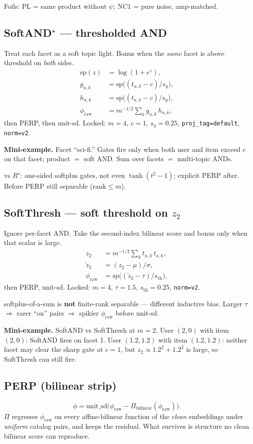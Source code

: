 \documentclass[11pt]{article}
\newcommand{\phonesub}[1]{\Needspace{6\baselineskip}\subsection*{#1}}
\newcommand{\Rstar}{R^{\star}}
\newcommand{\miniex}[1]{\par{\footnotesize\color{black!70}\textbf{Mini-example.} #1\par}}
\begin{document}
Foils: PL = same product without $\psi$;
NC1 = pure noise, amp-matched.

\phonesub{SoftAND$^{\star}$ --- thresholded AND}
Treat each facet as a soft topic light.
Bonus when the \emph{same} facet is above
threshold on \emph{both} sides.
\begin{align*}
\mathrm{sp}(z)&=\log(1+e^{z}),\\
g_{u,k}&=\mathrm{sp}\!\big((t_{u,k}-c)/s_g\big),\\
h_{a,k}&=\mathrm{sp}\!\big((t_{a,k}-c)/s_g\big),\\
\phi_{\mathrm{raw}}
  &= m^{-1/2}\sum_{k} g_{u,k}\,h_{a,k},
\end{align*}
then PERP, then unit-sd.
Locked: $m{=}4$, $c{=}1$, $s_g{=}0.25$,
\texttt{proj\_tag=default}, \texttt{norm=v2}.

\miniex{Facet ``sci-fi.''  Gates fire only
when both user and item exceed $c$ on that
facet; product $=$ soft AND.  Sum over
facets $=$ multi-topic ANDs.}

vs $\Rstar$: one-sided softplus gates, not
even $\tanh(t^{2}-1)$; explicit PERP after.
Before PERP still separable
($\mathrm{rank}\le m$).

\phonesub{SoftThresh --- soft threshold on $z_{2}$}
Ignore per-facet AND.  Take the second-index
bilinear score and bonus only when that
scalar is large.
\begin{align*}
z_{2}
  &= m^{-1/2}\sum_{k} t_{u,k}\,t_{a,k},\\
\tilde{z}_{2}
  &= (z_{2}-\mu)/\sigma,\\
\phi_{\mathrm{raw}}
  &= \mathrm{sp}\!\big(
       (\tilde{z}_{2}-\tau)/s_{\mathrm{th}}
     \big),
\end{align*}
then PERP, unit-sd.
Locked: $m{=}4$, $\tau{=}1.5$,
$s_{\mathrm{th}}{=}0.25$,
\texttt{norm=v2}.

softplus-of-a-sum is \textbf{not}
finite-rank separable --- different inductive
bias.  Larger $\tau$ $\Rightarrow$ rarer
``on'' pairs $\Rightarrow$ spikier
$\phi_{\mathrm{raw}}$ before unit-sd.

\miniex{SoftAND vs SoftThresh at $m{=}2$.
User $(2,0)$ with item $(2,0)$: SoftAND
fires on facet 1.  User $(1.2,1.2)$ with
item $(1.2,1.2)$: neither facet may clear
the sharp gate at $c{=}1$, but
$z_{2}\propto 1.2^{2}+1.2^{2}$ is large, so
SoftThresh can still fire.}

\phonesub{PERP (bilinear strip)}
\begin{equation*}
\phi
  = \mathrm{unit\_sd}\!\big(
      \phi_{\mathrm{raw}}
      - \Pi_{\mathrm{bilinear}}(\phi_{\mathrm{raw}})
    \big).
\end{equation*}
$\Pi$ regresses $\phi_{\mathrm{raw}}$ on every
affine-bilinear function of the
\emph{clean} embeddings under
\emph{uniform} catalog pairs, and keeps the
residual.  What survives is structure no
clean bilinear score can reproduce.
\end{document}
